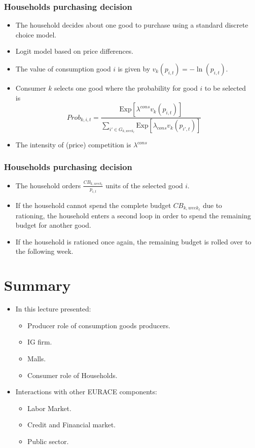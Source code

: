 \documentclass{beamer}
\begin{document}
\frame
{

 \frametitle{Households purchasing decision} 
\begin{itemize}
	\item The household decides about one good to purchase using a standard discrete choice model.
	\item Logit model based on price differences.
	\item The value of consumption good $i$ is given by $v_k(p_{i,t})=-\ln(p_{i,t}).$
	\item Consumer $k$ selects one good where the probability for good $i$ to be selected is
	\[
	Prob_{k,i,t} = \frac{\mbox{Exp}[\lambda^{cons}
v_{k}(p_{i,t})]}{\sum_{i' \in G_{k,week_t}}
\mbox{Exp}[\lambda_{cons} v_{k}(p_{i',t})]}
	\]
	\item The intensity of (price) competition is $\lambda^{cons}$


\end{itemize}


}
\frame
{

  \frametitle{Households purchasing decision} 
\begin{itemize}

\item The household orders $\frac{CB_{k,week_t}}{p_{i,t}}$ units of the selected good $i$.
\item If the household cannot spend the complete budget $CB_{k,week_t}$
due to rationing, the household enters a second loop in
order to spend the remaining budget for another good.
\item If the household is rationed once again, the remaining budget
is rolled over to the following week.

\end{itemize}
 
  
}

\section{Summary}
\frame
{
\begin{itemize}
	\item In this lecture presented:
	\begin{itemize}
	\item Producer role of consumption goods producers.
	\item IG firm.
	\item Malls.
	\item Consumer role of Households.
\end{itemize}

\item Interactions with other EURACE components:
\begin{itemize}
	\item Labor Market.
	\item Credit and Financial market.
	\item Public sector.
\end{itemize}
\end{itemize}
}

  
\end{document}
